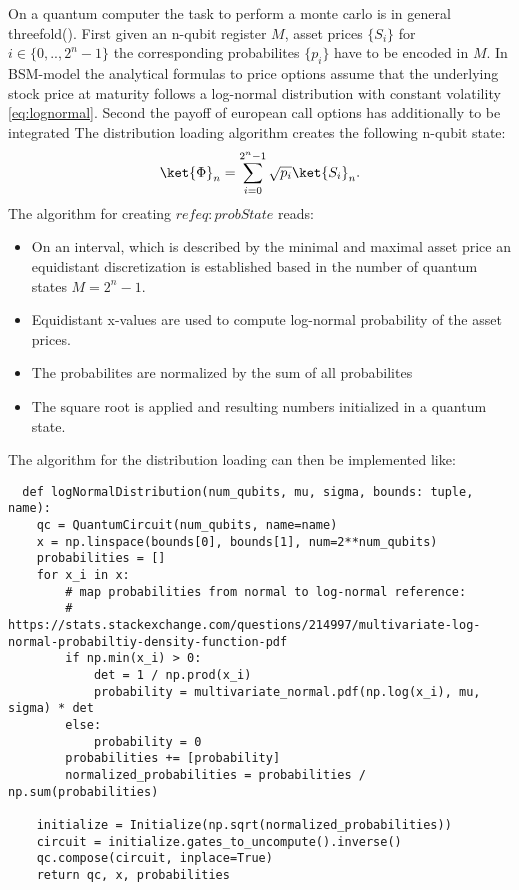 \documentclass[../../main.tex]{subfiles}
\begin{document}
On a quantum computer the task to perform a monte carlo is in general threefold(\cite{Stamatopoulos_2019}).
First given an n-qubit register $M$, asset prices $ \{ S_i \} $ for $ i \in \{ 0,..,2^n-1 \} $ the corresponding probabilites $ \{ p_i \}$ 
have to be encoded in $M$. In BSM-model the analytical formulas to price options assume that the underlying stock price at maturity follows a log-normal distribution
with constant volatility \ref{eq:lognormal}. Second the payoff of european call options has additionally to be integrated 
The distribution loading algorithm creates the following n-qubit state:
\begin{equation}\label{eq:probState}
\ket{\Phi}_n = \sum_{i=0}^{2^n-1} \sqrt{p_i} \ket{S_i}_n.
\end{equation}
The algorithm for creating $ref{eq:probState}$ reads:
\begin{itemize}
  \item On an interval, which is described by the minimal and maximal asset price an equidistant discretization is established
   based in the number of quantum states $M=2^n-1$.
  \item Equidistant x-values are used to compute log-normal probability of the asset prices.
  \item The probabilites are normalized by the sum of all probabilites
  \item The square root is applied and resulting numbers initialized in a quantum state.
\end{itemize} 
The algorithm for the distribution loading can then be implemented like:
\begin{lstlisting}
  def logNormalDistribution(num_qubits, mu, sigma, bounds: tuple, name):
    qc = QuantumCircuit(num_qubits, name=name)
    x = np.linspace(bounds[0], bounds[1], num=2**num_qubits)
    probabilities = []
    for x_i in x:
        # map probabilities from normal to log-normal reference:
        # https://stats.stackexchange.com/questions/214997/multivariate-log-normal-probabiltiy-density-function-pdf
        if np.min(x_i) > 0:
            det = 1 / np.prod(x_i)
            probability = multivariate_normal.pdf(np.log(x_i), mu, sigma) * det
        else:
            probability = 0
        probabilities += [probability]
        normalized_probabilities = probabilities / np.sum(probabilities) 
        
    initialize = Initialize(np.sqrt(normalized_probabilities))
    circuit = initialize.gates_to_uncompute().inverse()
    qc.compose(circuit, inplace=True)
    return qc, x, probabilities
\end{lstlisting}
\end{document}
